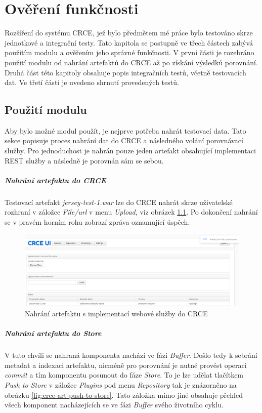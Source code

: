 \documentclass[czech,DP]{thesiskiv}
\begin{document}
\chapter{Ověření funkčnosti}
\label{sec:testing}

Rozšíření do systému CRCE, jež bylo předmětem mé práce bylo testováno skrze jednotkové a integrační testy. Tato kapitola se postupně ve třech částech zabývá použitím modulu a ověřením jeho správné funkčnosti. V první části je rozebráno použití modulu od nahrání artefaktů do CRCE až po získání výsledků porovnání. Druhá část této kapitoly obsahuje popis integračních testů, včetně testovacích dat. Ve třetí části je uvedeno shrnutí provedených testů.

\section{Použití modulu}

Aby bylo možné modul použít, je nejprve potřeba nahrát testovací data. Tato sekce popisuje proces nahrání dat do CRCE a následného volání porovnávací služby. Pro jednoduchost je nahrán pouze jeden artefakt obsahující implementaci REST služby a následně je porovnán sám se sebou.

\paragraph{Nahrání artefaktu do CRCE}
Testovací artefakt \textit{jersey-test-1.war} lze do CRCE nahrát skrze uživatelské rozhraní v záložce \textit{File/url} v menu \textit{Upload}, viz obrázek \ref{fig:crce-art-upload}. Po dokončení nahrání se v pravém horním rohu zobrazí zpráva oznamující úspěch.

\begin{figure}[h]
	\centering
	\includegraphics[width=\linewidth]{crce-art-upload.png}
	\caption{Nahrání artefaktu s implementací webové služby do CRCE}
	\label{fig:crce-art-upload}
\end{figure}

\paragraph{Nahrání artefaktu do Store}
V tuto chvíli se nahraná komponenta nachází ve fázi \textit{Buffer}. Došlo tedy k sebrání metadat a indexaci artefaktu, nicméně pro porovnání je nutné provést operaci \textit{commit} a tím komponentu posunout do fáze \textit{Store}. To je lze udělat tlačítkem \textit{Push to Store} v záložce \textit{Plugins} pod menu \textit{Repository} tak je znázorněno na obrázku \ref{fig:crce-art-push-to-store}. Tato záložka mimo jiné obsahuje přehled všech komponent nacházejících se ve fázi \textit{Buffer} svého životního cyklu.
\end{document}
